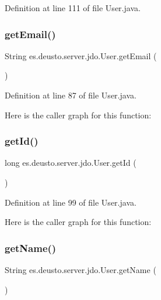 Definition at line 111 of file User.\+java.

\mbox{\label{classes_1_1deusto_1_1server_1_1jdo_1_1_user_aa1ba6d9e3d0572b90dac6ff627ee3f95}} 
\subsubsection{\texorpdfstring{getEmail()}{getEmail()}}
{\footnotesize\ttfamily String es.\+deusto.\+server.\+jdo.\+User.\+get\+Email (\begin{DoxyParamCaption}{ }\end{DoxyParamCaption})}



Definition at line 87 of file User.\+java.

Here is the caller graph for this function\+:
\mbox{\label{classes_1_1deusto_1_1server_1_1jdo_1_1_user_ac116b1ec523da06c6776eaa76c910125}} 
\subsubsection{\texorpdfstring{getId()}{getId()}}
{\footnotesize\ttfamily long es.\+deusto.\+server.\+jdo.\+User.\+get\+Id (\begin{DoxyParamCaption}{ }\end{DoxyParamCaption})}



Definition at line 99 of file User.\+java.

Here is the caller graph for this function\+:
\mbox{\label{classes_1_1deusto_1_1server_1_1jdo_1_1_user_ae241c2d5fbef940165041c82dc00edad}} 
\subsubsection{\texorpdfstring{getName()}{getName()}}
{\footnotesize\ttfamily String es.\+deusto.\+server.\+jdo.\+User.\+get\+Name (\begin{DoxyParamCaption}{ }\end{DoxyParamCaption})}



